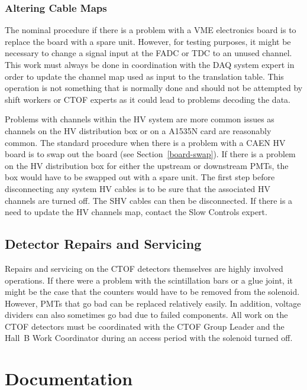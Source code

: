 \documentclass[12pt]{article}
\begin{document}
\subsubsection{Altering Cable Maps}

The nominal procedure if there is a problem with a VME electronics board is to replace the board with a spare
unit. However, for testing purposes, it might be necessary to change a signal input at the FADC or TDC to an
unused channel. This work must always be done in coordination with the DAQ system expert in order to update
the channel map used as input to the translation table. This operation is not something that is normally done and
should not be attempted by shift workers or CTOF experts as it could lead to problems decoding the data.

Problems with channels within the HV system are more common issues as channels on the HV distribution box or
on a A1535N card are reasonably common. The standard procedure when there is a problem with a CAEN HV
board is to swap out the board (see Section~\ref{board-swap}). If there is a problem on the HV distribution
box for either the upstream or downstream PMTs, the box would have to be swapped out with a spare unit. The
first step before disconnecting any system HV cables is to be sure that the associated HV channels are turned
off. The SHV cables can then be disconnected. If there is a need to update the HV channels map, contact the
Slow Controls expert.

\subsection{Detector Repairs and Servicing}

Repairs and servicing on the CTOF detectors themselves are highly involved operations. If there were a problem
with the scintillation bars or a glue joint, it might be the case that the counters would have to be removed from
the solenoid. However, PMTs that go bad can be replaced relatively easily. In addition, voltage dividers can also 
sometimes go bad due to failed components. All work on the CTOF detectors must be coordinated with the CTOF
Group Leader and the Hall~B Work Coordinator during an access period with the solenoid turned off.

\clearpage

\vfil
\eject

\section{Documentation}
\end{document}
